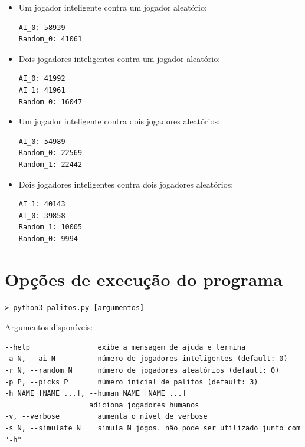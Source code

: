 \documentclass{article}
\begin{document}
\begin{itemize}

\item Um jogador inteligente contra um jogador aleatório:

\begin{verbatim}
AI_0: 58939
Random_0: 41061
\end{verbatim}


\item Dois jogadores inteligentes contra um jogador aleatório:

\begin{verbatim}
AI_0: 41992
AI_1: 41961
Random_0: 16047
\end{verbatim}


\item Um jogador inteligente contra dois jogadores aleatórios:

\begin{verbatim}
AI_0: 54989
Random_0: 22569
Random_1: 22442
\end{verbatim}


\item Dois jogadores inteligentes contra dois jogadores aleatórios:

\begin{verbatim}
AI_1: 40143
AI_0: 39858
Random_1: 10005
Random_0: 9994
\end{verbatim}

\end{itemize}


\section{Opções de execução do programa}

\begin{verbatim}
> python3 palitos.py [argumentos]
\end{verbatim}

Argumentos disponíveis:

\begin{verbatim}
--help                exibe a mensagem de ajuda e termina
-a N, --ai N          número de jogadores inteligentes (default: 0)
-r N, --random N      número de jogadores aleatórios (default: 0)
-p P, --picks P       número inicial de palitos (default: 3)
-h NAME [NAME ...], --human NAME [NAME ...]
                    adiciona jogadores humanos
-v, --verbose         aumenta o nível de verbose
-s N, --simulate N    simula N jogos. não pode ser utilizado junto com "-h"

\end{verbatim}
\end{document}
